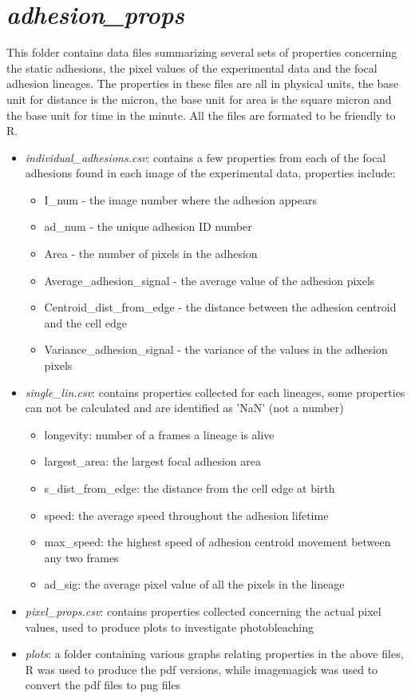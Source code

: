 \documentclass[letterpaper]{article}
\begin{document}
\section*{\emph{adhesion\_props}}
This folder contains data files summarizing several sets of properties concerning the static adhesions, the pixel values of the experimental data and the focal adhesion lineages. The properties in these files are all in physical units, the base unit for distance is the micron, the base unit for area is the square micron and the base unit for time in the minute. All the files are formated to be friendly to R.

\begin{itemize}
\item \emph{individual\_adhesions.csv}: contains a few properties from each of the focal adhesions found in each image of the experimental data, properties include:
	\begin{itemize}
	\item I\_num - the image number where the adhesion appears
	\item ad\_num - the unique adhesion ID number
	\item Area - the number of pixels in the adhesion
	\item Average\_adhesion\_signal - the average value of the adhesion pixels
	\item Centroid\_dist\_from\_edge - the distance between the adhesion centroid and the cell edge
	\item Variance\_adhesion\_signal - the variance of the values in the adhesion pixels
	\end{itemize}
\item \emph{single\_lin.csv}: contains properties collected for each lineages, some properties can not be calculated and are identified as 'NaN' (not a number)
	\begin{itemize}
	\item longevity: number of a frames a lineage is alive
	\item largest\_area: the largest focal adhesion area
	\item s\_dist\_from\_edge: the distance from the cell edge at birth
	\item speed: the average speed throughout the adhesion lifetime
	\item max\_speed: the highest speed of adhesion centroid movement between any two frames
	\item ad\_sig: the average pixel value of all the pixels in the lineage
	\end{itemize}
\item \emph{pixel\_props.csv}: contains properties collected concerning the actual pixel values, used to produce plots to investigate photobleaching
\item \emph{plots}: a folder containing various graphs relating properties in the above files, R was used to produce the pdf versions, while imagemagick was used to convert the pdf files to png files
\end{itemize}
\end{document}
